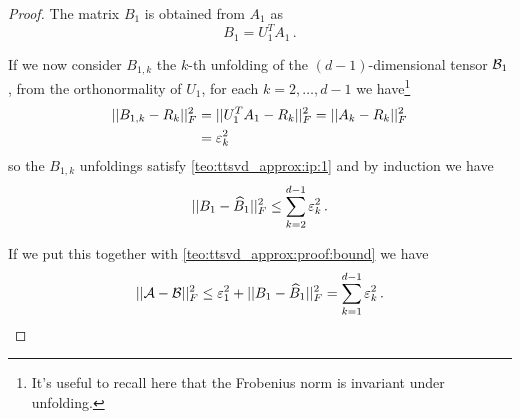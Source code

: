 \begin{Teo}
\begin{proof}
    The matrix $B_1$ is obtained from $A_1$ as
    \begin{equation*}
      B_1 = U_1^T A_1\, .
    \end{equation*}

    If we now consider $B_{1,k}$ the $k$-th unfolding of the $(d-1)$-dimensional tensor $\mathcal{B}_1$, from the orthonormality of $U_1$, for each $k=2,\ldots,d-1$ we have\footnote{It's useful to recall here that the Frobenius norm is invariant under unfolding.}
    \begin{equation*}
      \begin{split}
        ||B_{1,k} - R_k||_F^2 &= ||U_1^T A_1 - R_k||_F^2 = ||A_k - R_k||_F^2\\
         &= \varepsilon_k^2
      \end{split}
    \end{equation*}
    so the $B_{1,k}$ unfoldings satisfy \eqref{teo:ttsvd_approx:ip:1} and by induction we have
    \begin{equation*}
      ||B_1 - \widehat{B}_1 ||_F^2 \le \sum_{k=2}^{d-1} \varepsilon_k^2\, .
    \end{equation*}

    If we put this together with \eqref{teo:ttsvd_approx:proof:bound} we have
    \begin{equation*}
      ||\mathcal{A} - \mathcal{B}||_F^2 \le \varepsilon_1^2 + ||B_1 - \widehat{B}_1 ||_F^2 = \sum_{k=1}^{d-1} \varepsilon_k^2\, .
    \end{equation*}
  \end{proof}
\end{Teo}

